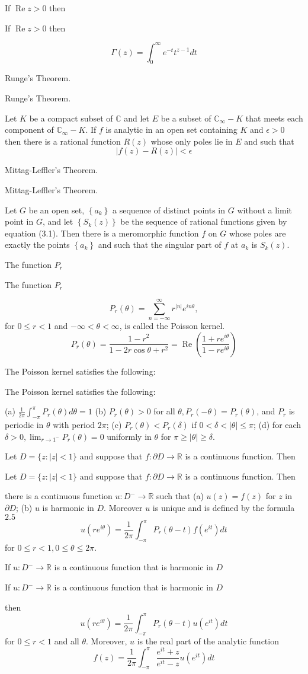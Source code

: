 \documentclass[17pt]{extarticle}
\newcommand{\boxset}[2]{\begin{mdframed}[style=darkQuesion]
#1
\end{mdframed}
\newpage
\begin{mdframed}[style=darkQuesion]
  #1
    \end{mdframed}
\begin{mdframed}[style=darkAnswer]
  #2
    \end{mdframed}
    \newpage
}
\begin{document}
\boxset{If $\operatorname{Re} z>0$ then}
{
$$
\Gamma(z)=\int_{0}^{\infty} e^{-t} t^{z-1} d t
$$
}

\boxset{Runge's Theorem.}
{Let $K$ be a compact subset of $\mathbb{C}$ and let $E$ be a subset of $\mathbb{C}_{\infty}-K$ that meets each component of $\mathbb{C}_{\infty}-K$. If $f$ is analytic in an open set containing $K$ and $\epsilon>0$ then there is a rational function $R(z)$ whose only poles lie in $E$ and such that
$$
|f(z)-R(z)|<\epsilon
$$
}

\boxset{Mittag-Leffler's Theorem.}
{Let $G$ be an open set, $\left\{a_{k}\right\}$ a sequence of distinct points in $G$ without a limit point in $G$, and let $\left\{S_{k}(z)\right\}$ be the sequence of rational functions given by equation (3.1). Then there is a meromorphic function $f$ on $G$ whose poles are exactly the points $\left\{a_{k}\right\}$ and such that the singular part of $f$ at $a_{k}$ is $S_{k}(z)$.}

\boxset{The function $P_r$}
{$$
P_{r}(\theta)=\sum_{n=-\infty}^{\infty} r^{|n|} e^{i n \theta},
$$
for $0 \leq r<1$ and $-\infty<\theta<\infty$, is called the Poisson kernel.
$$
P_{r}(\theta)=\frac{1-r^{2}}{1-2 r \cos \theta+r^{2}}=\operatorname{Re}\left(\frac{1+r e^{i \theta}}{1-r e^{i \theta}}\right)
$$
}

\boxset{The Poisson kernel satisfies the following:}
{
(a) $\frac{1}{2 \pi} \int_{-\pi}^{\pi} P_{r}(\theta) d \theta=1$
(b) $P_{r}(\theta)>0$ for all $\theta, P_{r}(-\theta)=P_{r}(\theta)$, and $P_{r}$ is periodic in $\theta$ with period $2 \pi$;
(c) $P_{r}(\theta)<P_{r}(\delta)$ if $0<\delta<|\theta| \leq \pi$;
(d) for each $\delta>0, \lim _{r \rightarrow 1^{-}} P_{r}(\theta)=0$ uniformly in $\theta$ for $\pi \geq|\theta| \geq \delta$.
}
\boxset{Let $D=\{z:|z|<1\}$ and suppose that $f: \partial D \rightarrow \mathbb{R}$ is a continuous function. Then}
{there is a continuous function $u: D^{-} \rightarrow \mathbb{R}$ such that
(a) $u(z)=f(z)$ for $z$ in $\partial D$;
(b) $u$ is harmonic in $D$.
Moreover $u$ is unique and is defined by the formula $2.5$
$$
u\left(r e^{i \theta}\right)=\frac{1}{2 \pi} \int_{-\pi}^{\pi} P_{r}(\theta-t) f\left(e^{i t}\right) d t
$$
for $0 \leq r<1,0 \leq \theta \leq 2 \pi$.
}

\boxset{If $u: D^{-} \rightarrow \mathbb{R}$ is a continuous function that is harmonic in $D$}
{
then
$$
u\left(r e^{i \theta}\right)=\frac{1}{2 \pi} \int_{-\pi}^{\pi} P_{r}(\theta-t) u\left(e^{i t}\right) d t
$$
for $0 \leq r<1$ and all $\theta$. Moreover, $u$ is the real part of the analytic function
$$
f(z)=\frac{1}{2 \pi} \int_{-\pi}^{\pi} \frac{e^{i t}+z}{e^{i t}-z} u\left(e^{i t}\right) d t
$$
}
\end{document}
